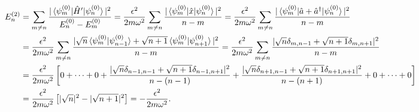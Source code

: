 \documentclass[10pt]{article}
\newcommand{\1}{\mathbf 1}
\begin{document}
\begin{align}
	E^{(2)}_n
	&=\nonumber
	\sum_{m\ne n}
	\frac{|\braket{\psi_m^{(0)} | \hat H' | \psi_n^{(0)}}|^2}{E^{(0)}_n - E_m^{(0)}}
	=
	\frac{\epsilon^2}{2m\omega^2}
	\sum_{m\ne n}
	\frac{|
	\braket{\psi_m^{(0)} | \hat x | \psi_n^{(0)}}
	|^2}{n-m}
	=
	\frac{\epsilon^2}{2m\omega^2}
	\sum_{m\ne n}
	\frac{|
	\braket{\psi_m^{(0)} | \hat a + \hat a^\dagger| \psi_n^{(0)}}
	|^2}{n-m}
	\\
	&
	=
	\frac{\epsilon^2}{2m\omega^2}
	\sum_{m\ne n}
	\frac{|
	\sqrt{n}
	\braket{\psi_m^{(0)} | \psi_{n-1}^{(0)}}
	+
	\sqrt{n+1}
	\braket{\psi_m^{(0)} | \psi_{n+1}^{(0)}}
	|^2}{n-m}
	=
	\frac{\epsilon^2}{2m\omega^2}
	\sum_{m\ne n}
	\frac{|
	\sqrt{n}
	\delta_{m,n-1}
	+
	\sqrt{n+1}
	\delta_{m,n+1}
	|^2}{n-m}
	\nonumber
	\\
	&=\nonumber
	\frac{\epsilon^2}{2m\omega^2}
	\left[
		0+\cdots+0
		+
		\frac{|
		\sqrt{n}
		\delta_{n-1,n-1}
		+
		\sqrt{n+1}
		\delta_{n-1,n+1}
		|^2}{n-(n-1)}
		+
		\frac{|
		\sqrt{n}
		\delta_{n+1,n-1}
		+
		\sqrt{n+1}
		\delta_{n+1,n+1}
		|^2}{n-(n+1)}
		+
		0+\cdots+0
	\right]
	\\
	&=
	\frac{\epsilon^2}{2m\omega^2}
	\left[
		|\sqrt{n}|^2
		-
		|\sqrt{n+1}|^2
	\right]
	=
	-\frac{\epsilon^2}{2m\omega^2}.
	\end{align}
\end{document}
